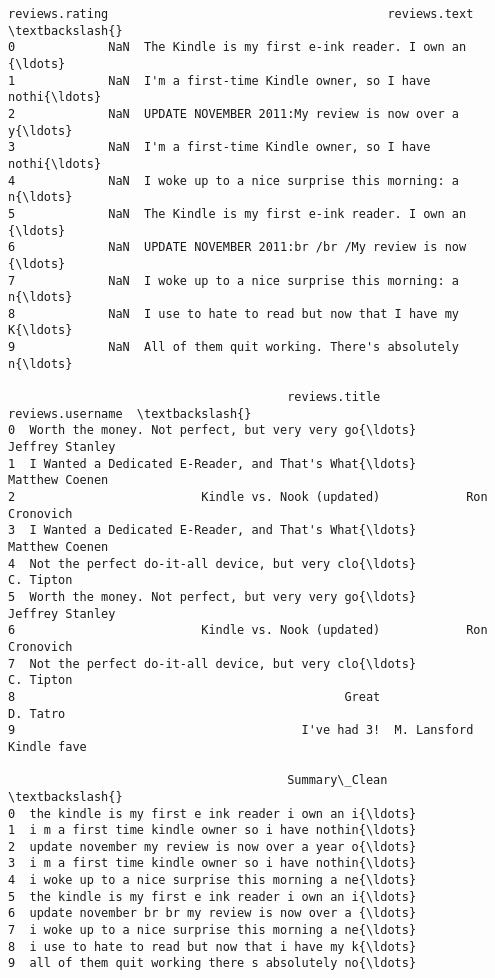 \documentclass[11pt]{article}
\makeatletter
\newcommand{\boxspacing}{\kern\kvtcb@left@rule\kern\kvtcb@boxsep}
\newcommand{\prompt}[4]{
        \ttfamily\llap{{\color{#2}[#3]:\hspace{3pt}#4}}\vspace{-\baselineskip}
    }
\makeatother
\begin{document}
            \begin{tcolorbox}[breakable, size=fbox, boxrule=.5pt, pad at break*=1mm, opacityfill=0]
\prompt{Out}{outcolor}{26}{\boxspacing}
\begin{Verbatim}[commandchars=\\\{\}]
   reviews.rating                                       reviews.text  \textbackslash{}
0             NaN  The Kindle is my first e-ink reader. I own an {\ldots}
1             NaN  I'm a first-time Kindle owner, so I have nothi{\ldots}
2             NaN  UPDATE NOVEMBER 2011:My review is now over a y{\ldots}
3             NaN  I'm a first-time Kindle owner, so I have nothi{\ldots}
4             NaN  I woke up to a nice surprise this morning: a n{\ldots}
5             NaN  The Kindle is my first e-ink reader. I own an {\ldots}
6             NaN  UPDATE NOVEMBER 2011:br /br /My review is now {\ldots}
7             NaN  I woke up to a nice surprise this morning: a n{\ldots}
8             NaN  I use to hate to read but now that I have my K{\ldots}
9             NaN  All of them quit working. There's absolutely n{\ldots}

                                       reviews.title         reviews.username  \textbackslash{}
0  Worth the money. Not perfect, but very very go{\ldots}          Jeffrey Stanley
1  I Wanted a Dedicated E-Reader, and That's What{\ldots}           Matthew Coenen
2                          Kindle vs. Nook (updated)            Ron Cronovich
3  I Wanted a Dedicated E-Reader, and That's What{\ldots}           Matthew Coenen
4  Not the perfect do-it-all device, but very clo{\ldots}                C. Tipton
5  Worth the money. Not perfect, but very very go{\ldots}          Jeffrey Stanley
6                          Kindle vs. Nook (updated)            Ron Cronovich
7  Not the perfect do-it-all device, but very clo{\ldots}                C. Tipton
8                                              Great                 D. Tatro
9                                        I've had 3!  M. Lansford Kindle fave

                                       Summary\_Clean  \textbackslash{}
0  the kindle is my first e ink reader i own an i{\ldots}
1  i m a first time kindle owner so i have nothin{\ldots}
2  update november my review is now over a year o{\ldots}
3  i m a first time kindle owner so i have nothin{\ldots}
4  i woke up to a nice surprise this morning a ne{\ldots}
5  the kindle is my first e ink reader i own an i{\ldots}
6  update november br br my review is now over a {\ldots}
7  i woke up to a nice surprise this morning a ne{\ldots}
8  i use to hate to read but now that i have my k{\ldots}
9  all of them quit working there s absolutely no{\ldots}


\end{Verbatim}
\end{tcolorbox}
\end{document}
